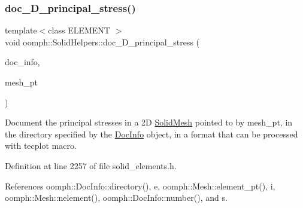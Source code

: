 \subsubsection{\texorpdfstring{doc\+\_\+D\+\_\+principal\+\_\+stress()}{doc\_2D\_principal\_stress()}}
{\footnotesize\ttfamily template$<$class E\+L\+E\+M\+E\+NT $>$ \\
void oomph\+::\+Solid\+Helpers\+::doc\+\_\+D\+\_\+principal\+\_\+stress (\begin{DoxyParamCaption}\item[{\hyperlink{classoomph_1_1DocInfo}{Doc\+Info} \&}]{doc\+\_\+info,  }\item[{\hyperlink{classoomph_1_1SolidMesh}{Solid\+Mesh} $\ast$}]{mesh\+\_\+pt }\end{DoxyParamCaption})}



Document the principal stresses in a 2D \hyperlink{classoomph_1_1SolidMesh}{Solid\+Mesh} pointed to by {\ttfamily mesh\+\_\+pt}, in the directory specified by the \hyperlink{classoomph_1_1DocInfo}{Doc\+Info} object, in a format that can be processed with tecplot macro. 



Definition at line 2257 of file solid\+\_\+elements.\+h.



References oomph\+::\+Doc\+Info\+::directory(), e, oomph\+::\+Mesh\+::element\+\_\+pt(), i, oomph\+::\+Mesh\+::nelement(), oomph\+::\+Doc\+Info\+::number(), and s.

